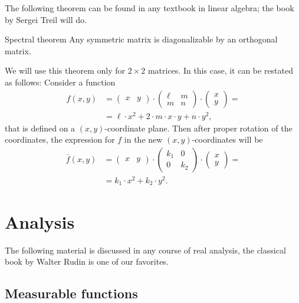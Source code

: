 \begin{multicols}{2}
{The following theorem can be found in any textbook in linear algebra;
the book by Sergei Treil \cite{treil} will do.

\begin{thm}{Spectral theorem}\label{thm:spectral}
Any symmetric matrix is diagonalizable  by an orthogonal matrix.
\end{thm}

We will use this theorem only for $2{\times}2$ matrices.
In this case, it can be restated as follows:
Consider a function 
\begin{align*}
f(x,y)&=
\begin{pmatrix}
x&y
\end{pmatrix}
\cdot
\begin{pmatrix}
\ell&m
\\
m&n
\end{pmatrix}
\cdot
\begin{pmatrix}
x\\y
\end{pmatrix}=
\\
&=\ell\cdot x^2+2\cdot m\cdot x\cdot y+n\cdot y^2,
\end{align*}
that is defined on a $(x,y)$-coordinate plane.
Then after proper rotation of the coordinates, 
the expression for $f$ in the new $(x,y)$-coordinates will be
\begin{align*}
\bar f(x,y)&=
\begin{pmatrix}
x&y
\end{pmatrix}
\cdot
\begin{pmatrix}
k_1&0
\\
0&k_2
\end{pmatrix}
\cdot
\begin{pmatrix}
x\\y
\end{pmatrix}=
\\
&=k_1\cdot x^2+k_2\cdot y^2.
\end{align*}

\section{Analysis}\label{sec:analysis}

The following material is discussed in any course of real analysis, the classical book by Walter Rudin \cite{rudin} is one of our favorites.

\subsection*{Measurable functions}

}
\end{multicols}
